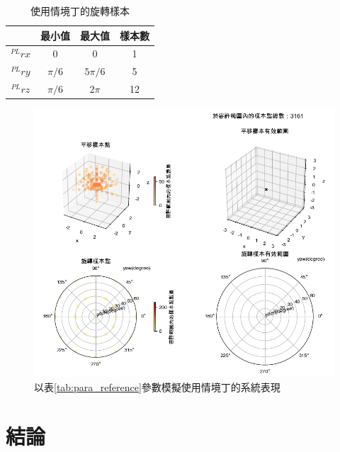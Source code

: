   \begin{table}[htpb]
    \begin{center}
      \caption{使用情境丁的旋轉樣本}
      \label{tab:D_rotate}
      \begin{tabular}{c|c|c|c} %
         & \textbf{最小值} & \textbf{最大值}&\textbf{樣本數}\\
        \hline
        $^{PL}rx$ & 0 &0&1\\
        $^{PL}ry$ & $\pi/6$ & $5\pi/6$ & 5\\
        $^{PL}rz$ & $\pi/6$ & $2\pi$ &12\\
      \end{tabular}
    \end{center}
  \end{table}

\begin{figure}[htpb]
    \centering
    \includegraphics[width=15cm]{ch4pic/scene_d_solve.png}
    \caption{以表\ref{tab:para_reference}參數模擬使用情境丁的系統表現}
    \label{pic:scenario_d_solve}
\end{figure}



\section{結論}
\label{chp:4_conclusion}

